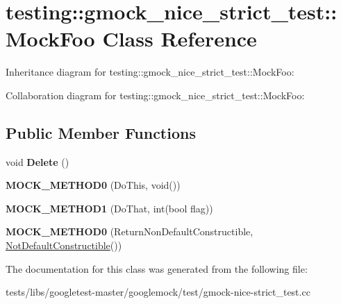 \hypertarget{classtesting_1_1gmock__nice__strict__test_1_1MockFoo}{}\section{testing\+:\+:gmock\+\_\+nice\+\_\+strict\+\_\+test\+:\+:Mock\+Foo Class Reference}
\label{classtesting_1_1gmock__nice__strict__test_1_1MockFoo}


Inheritance diagram for testing\+:\+:gmock\+\_\+nice\+\_\+strict\+\_\+test\+:\+:Mock\+Foo\+:


Collaboration diagram for testing\+:\+:gmock\+\_\+nice\+\_\+strict\+\_\+test\+:\+:Mock\+Foo\+:
\subsection*{Public Member Functions}
\begin{DoxyCompactItemize}
\item 
\mbox{\label{classtesting_1_1gmock__nice__strict__test_1_1MockFoo_a7bdec6a6353e4396d551dbf8f2beac54}} 
void {\bfseries Delete} ()
\item 
\mbox{\label{classtesting_1_1gmock__nice__strict__test_1_1MockFoo_a14ee661ebc461096824e876a9308840e}} 
{\bfseries M\+O\+C\+K\+\_\+\+M\+E\+T\+H\+O\+D0} (Do\+This, void())
\item 
\mbox{\label{classtesting_1_1gmock__nice__strict__test_1_1MockFoo_a3a7bfcf303a2c8578db900c9525b02a1}} 
{\bfseries M\+O\+C\+K\+\_\+\+M\+E\+T\+H\+O\+D1} (Do\+That, int(bool flag))
\item 
\mbox{\label{classtesting_1_1gmock__nice__strict__test_1_1MockFoo_a2d69a27a8789f04938cb1eb0047bb677}} 
{\bfseries M\+O\+C\+K\+\_\+\+M\+E\+T\+H\+O\+D0} (Return\+Non\+Default\+Constructible, \hyperlink{classtesting_1_1gmock__nice__strict__test_1_1NotDefaultConstructible}{Not\+Default\+Constructible}())
\end{DoxyCompactItemize}


The documentation for this class was generated from the following file\+:\begin{DoxyCompactItemize}
\item 
tests/libs/googletest-\/master/googlemock/test/gmock-\/nice-\/strict\+\_\+test.\+cc\end{DoxyCompactItemize}
